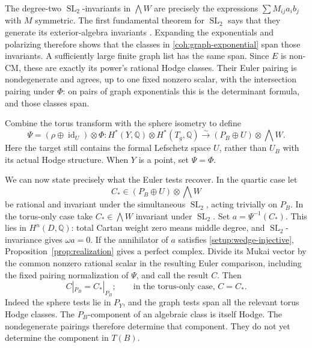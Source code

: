 \documentclass[11pt]{article}
\numberwithin{equation}{section}
\theoremstyle{definition}
\theoremstyle{remark}
\newcommand{\Q}{\mathbb Q}
\DeclareMathOperator{\SL}{SL}
\DeclareMathOperator{\id}{id}
\begin{document}
The degree-two \(\SL_2\)-invariants in \(\bigwedge W\) are precisely
the expressions \(\sum M_{ij}a_i b_j\) with \(M\) symmetric.  The
first fundamental theorem for \(\SL_2\) says that they generate its
exterior-algebra invariants \cite{WeylClassicalGroups}.  Expanding the exponentials and polarizing
therefore shows that the classes in
\eqref{coh:graph-exponential} span those invariants.  A sufficiently
large finite graph list has the same span.  Since \(E\) is non-CM,
these are exactly its power's rational Hodge classes.  Their Euler
pairing is nondegenerate and agrees, up to one fixed nonzero scalar,
with the intersection pairing under \(\Phi\): on pairs of graph
exponentials this is the determinant formula, and those classes span.

Combine the torus transform with the sphere isometry to define
\begin{equation}\label{coh:dictionary}
 \Psi=(\rho\oplus\id_U)\otimes\Phi:
 H^*(Y,\Q)\otimes H^*(T_g,\Q)
 \xrightarrow{\sim}(P_B\oplus U)\otimes\bigwedge W.
\end{equation}
Here the target still contains the formal Lefschetz space \(U\),
rather than \(U_B\) with its actual Hodge structure.  When \(Y\) is
a point, set \(\Psi=\Phi\).

We can now state precisely what the Euler tests recover.  In the
quartic case let
\begin{equation}\label{coh:input-space}
 C_*\in (P_B\oplus U)\otimes\bigwedge W
\end{equation}
be rational and invariant under the simultaneous \(\SL_2\), acting
trivially on \(P_B\).  In the torus-only case take
\(C_*\in\bigwedge W\) invariant under \(\SL_2\).
Set \(a=\Psi^{-1}(C_*)\).  This lies in \(H^n(D,\Q)\): total Cartan weight
zero means middle degree, and \(\SL_2\)-invariance gives
\(\omega a=0\).
If the annihilator of \(a\) satisfies
\eqref{setup:wedge-injective}, Proposition~\ref{prop:realization}
gives a perfect complex.  Divide its Mukai vector by the common
nonzero rational scalar in the resulting Euler comparison, including
the fixed pairing normalization of \(\Psi\), and call the result \(C\).
Then
\begin{equation}\label{coh:determined-component}
 C|_{P_B}=C_*|_{P_B};
 \qquad\text{in the torus-only case, }C=C_*.
\end{equation}
Indeed the sphere tests lie in \(P_Y\), and the graph tests span all
the relevant torus Hodge classes.  The \(P_B\)-component of an
algebraic class is itself Hodge.  The nondegenerate pairings therefore
determine that component.  They do not yet determine the component in
\(T(B)\).
\end{document}
